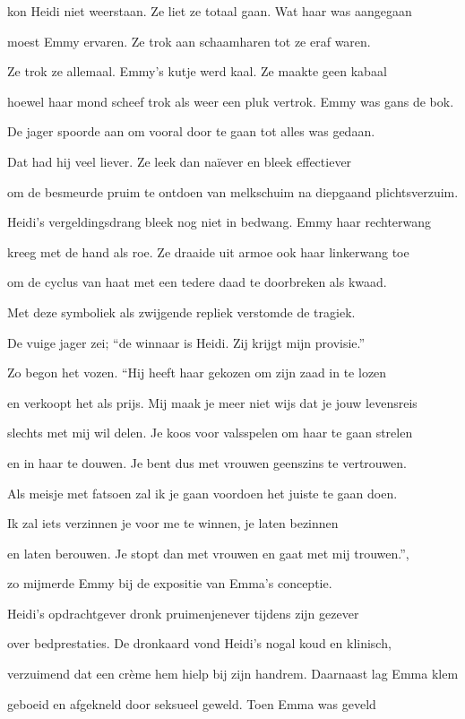 kon Heidi niet weerstaan.
Ze liet ze totaal gaan.
Wat haar was aangegaan

moest Emmy ervaren.
Ze trok aan schaamharen
tot ze eraf waren.

Ze trok ze allemaal.
Emmy’s kutje werd kaal.
Ze maakte geen kabaal

hoewel haar mond scheef trok
als weer een pluk vertrok.
Emmy was gans de bok.

De jager spoorde aan
om vooral door te gaan
tot alles was gedaan.

Dat had hij veel liever.
Ze leek dan naïever
en bleek effectiever

om de besmeurde pruim
te ontdoen van melkschuim
na diepgaand plichtsverzuim.

Heidi’s vergeldingsdrang
bleek nog niet in bedwang.
Emmy haar rechterwang

kreeg met de hand als roe.
Ze draaide uit armoe
ook haar linkerwang toe

om de cyclus van haat
met een tedere daad
te doorbreken als kwaad.

Met deze symboliek
als zwijgende repliek
verstomde de tragiek.

De vuige jager zei;
“de winnaar is Heidi.
Zij krijgt mijn provisie.”

Zo begon het vozen.
“Hij heeft haar gekozen
om zijn zaad in te lozen

en verkoopt het als prijs.
Mij maak je meer niet wijs
dat je jouw levensreis

slechts met mij wil delen.
Je koos voor valsspelen
om haar te gaan strelen

en in haar te douwen.
Je bent dus met vrouwen
geenszins te vertrouwen.

Als meisje met fatsoen
zal ik je gaan voordoen
het juiste te gaan doen.

Ik zal iets verzinnen
je voor me te winnen,
je laten bezinnen

en laten berouwen.
Je stopt dan met vrouwen
en gaat met mij trouwen.”,

zo mijmerde Emmy
bij de expositie
van Emma’s conceptie.

Heidi’s opdrachtgever
dronk pruimenjenever
tijdens zijn gezever

over bedprestaties.
De dronkaard vond Heidi’s
nogal koud en klinisch,

verzuimend dat een crème
hem hielp bij zijn handrem.
Daarnaast lag Emma klem

geboeid en afgekneld
door seksueel geweld.
Toen Emma was geveld

